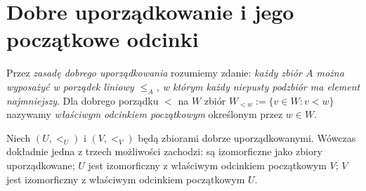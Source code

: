 \section{Dobre uporządkowanie i jego początkowe odcinki}
\begin{definicja}
\label{def:wellorder-principle}
Przez \emph{zasadę dobrego uporządkowania} rozumiemy zdanie:
\emph{każdy zbiór $A$ można wyposażyć w porządek liniowy $\le_A$,
w którym każdy niepusty podzbiór ma element najmniejszy}.
Dla dobrego porządku $<$ na $W$ zbiór
$W_{<w}:=\{v\in W:v<w\}$ nazywamy \emph{właściwym odcinkiem
początkowym} określonym przez $w\in W$.
\end{definicja}

\begin{lemat}
\label{lem:choice-wellorder-comparison}
Niech $(U,<_{U})$ i $(V,<_{V})$ będą zbiorami dobrze
uporządkowanymi. Wówczas dokładnie jedna z trzech
możliwości zachodzi: są izomorficzne jako zbiory uporządkowane;
$U$ jest izomorficzny z właściwym odcinkiem początkowym $V$;
$V$ jest izomorficzny z właściwym odcinkiem początkowym $U$.
\end{lemat}
